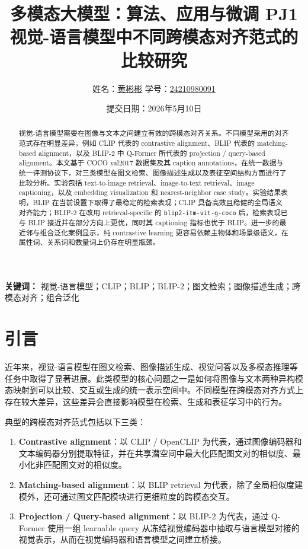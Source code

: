 \documentclass[UTF8,a4paper,10pt]{ctexart}
\title{
\textbf{多模态大模型：算法、应用与微调 PJ1}\\
\large 视觉-语言模型中不同跨模态对齐范式的比较研究
}
\author{
{\small 姓名：\underline{\hspace{0.7cm}黄彬彬\hspace{0.7cm}} \quad 学号：\underline{\hspace{0.7cm}24210980091\hspace{0.7cm}}}
}
\date{{\small 提交日期：2026年5月10日}}
\begin{document}
\maketitle

\begin{abstract}
视觉-语言模型需要在图像与文本之间建立有效的跨模态对齐关系。不同模型采用的对齐范式存在明显差异，例如 CLIP 代表的 contrastive alignment、BLIP 代表的 matching-based alignment，以及 BLIP-2 中 Q-Former 所代表的 projection / query-based alignment。本文基于 COCO val2017 数据集及其 caption annotations，在统一数据与统一评测协议下，对三类模型在图文检索、图像描述生成以及表征空间结构方面进行了比较分析。实验包括 text-to-image retrieval、image-to-text retrieval、image captioning，以及 embedding visualization 和 nearest-neighbor case study。实验结果表明，BLIP 在当前设置下取得了最稳定的检索表现；CLIP 具备高效且稳健的全局语义对齐能力；BLIP-2 在改用 retrieval-specific 的 \texttt{blip2-itm-vit-g-coco} 后，检索表现已与 BLIP 接近并在部分方向上更优，同时其 captioning 指标也优于 BLIP。进一步的最近邻与组合泛化案例显示，纯 contrastive learning 更容易依赖主物体和场景级语义，在属性词、关系词和数量词上仍存在明显瓶颈。
\end{abstract}

\textbf{关键词：} 视觉-语言模型；CLIP；BLIP；BLIP-2；图文检索；图像描述生成；跨模态对齐；组合泛化

\newpage

\tableofcontents

\newpage

\section{引言}

近年来，视觉-语言模型在图文检索、图像描述生成、视觉问答以及多模态推理等任务中取得了显著进展。此类模型的核心问题之一是如何将图像与文本两种异构模态映射到可以比较、交互或生成的统一表示空间中。不同模型在跨模态对齐方式上存在较大差异，这些差异会直接影响模型在检索、生成和表征学习中的行为。

典型的跨模态对齐范式包括以下三类：

\begin{enumerate}[label=(\arabic*)]
    \item \textbf{Contrastive alignment}：以 CLIP / OpenCLIP 为代表，通过图像编码器和文本编码器分别提取特征，并在共享潜空间中最大化匹配图文对的相似度、最小化非匹配图文对的相似度。
    \item \textbf{Matching-based alignment}：以 BLIP retrieval 为代表，除了全局相似度建模外，还可通过图文匹配模块进行更细粒度的跨模态交互。
    \item \textbf{Projection / Query-based alignment}：以 BLIP-2 为代表，通过 Q-Former 使用一组 learnable query 从冻结视觉编码器中抽取与语言模型对接的视觉表示，从而在视觉编码器和语言模型之间建立桥接。
\end{enumerate}
\end{document}
